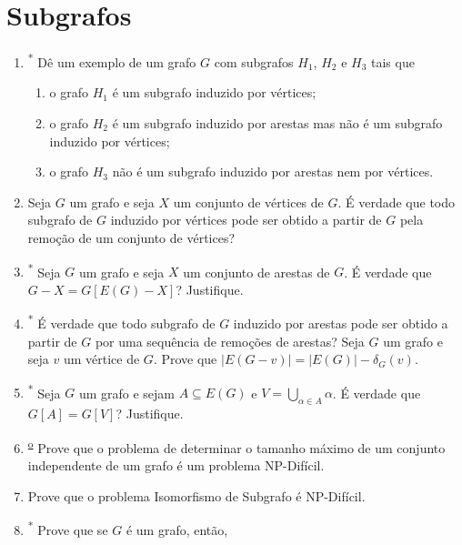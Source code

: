 \section{Subgrafos}

\begin{enumerate}[label=\textbf{\arabic*.}, ref=\arabic*, resume]
    \item\textsuperscript{*} Dê um exemplo de um grafo $G$ com subgrafos $H_{1}$, $H_{2}$ e $H_{3}$ tais que 
    \begin{enumerate}
        \item o grafo $H_{1}$ é um subgrafo induzido por vértices; 
        \item o grafo $H_{2}$ é um subgrafo induzido por arestas mas não é um subgrafo induzido por vértices; 
        \item o grafo $H_{3}$ não é um subgrafo induzido por arestas nem por vértices. 
    \end{enumerate}
    
    \item Seja $G$ um grafo e seja $X$ um conjunto de vértices de $G$. É verdade que todo subgrafo de $G$ induzido por vértices pode ser obtido a partir de $G$ pela remoção de um conjunto de vértices?
    
    \item\textsuperscript{*} Seja $G$ um grafo e seja $X$ um conjunto de arestas de $G$. É verdade que $G-X=G[E(G)-X]$? Justifique. 
    
    \item\textsuperscript{*} É verdade que todo subgrafo de $G$ induzido por arestas pode ser obtido a partir de $G$ por uma sequência de remoções de arestas?
    Seja $G$ um grafo e seja $v$ um vértice de $G$. Prove que $|E(G-v)|=|E(G)|-\delta_{G}(v)$.
    
    \item\textsuperscript{*} Seja $G$ um grafo e sejam $A\subseteq E(G)$ e $V=\bigcup_{\alpha\in A}\alpha$. É verdade que $G[A]=G[V]$? Justifique. 
    
    \item\textsuperscript{\underline{o}} Prove que o problema de determinar o tamanho máximo de um conjunto independente de um grafo é um problema NP-Difícil.
    
    \item Prove que o problema Isomorfismo de Subgrafo é NP-Difícil.
    
    \item\textsuperscript{*} Prove que se $G$ é um grafo, então, 
    

\end{enumerate}
